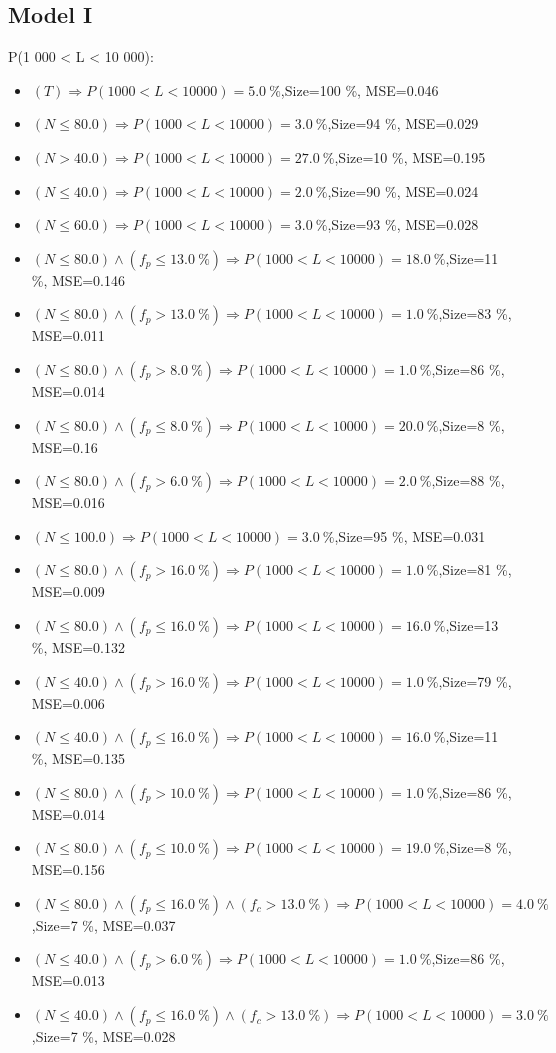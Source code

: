 \documentclass[numbered]{CSL}
\begin{document}
\subsection{Model I}
P(1 000 < L < 10 000):
\begin{itemize}
\item $(T) \Rightarrow P(1 000 < L < 10 000) = 5.0~\%$,\hfill Size=100 \%, MSE=0.046
\item $(N \leq 80.0) \Rightarrow P(1 000 < L < 10 000) = 3.0~\%$,\hfill Size=94 \%, MSE=0.029
\item $(N > 40.0) \Rightarrow P(1 000 < L < 10 000) = 27.0~\%$,\hfill Size=10 \%, MSE=0.195
\item $(N \leq 40.0) \Rightarrow P(1 000 < L < 10 000) = 2.0~\%$,\hfill Size=90 \%, MSE=0.024
\item $(N \leq 60.0) \Rightarrow P(1 000 < L < 10 000) = 3.0~\%$,\hfill Size=93 \%, MSE=0.028
\item $(N \leq 80.0) \land (f_p \leq 13.0~\%) \Rightarrow P(1 000 < L < 10 000) = 18.0~\%$,\hfill Size=11 \%, MSE=0.146
\item $(N \leq 80.0) \land (f_p > 13.0~\%) \Rightarrow P(1 000 < L < 10 000) = 1.0~\%$,\hfill Size=83 \%, MSE=0.011
\item $(N \leq 80.0) \land (f_p > 8.0~\%) \Rightarrow P(1 000 < L < 10 000) = 1.0~\%$,\hfill Size=86 \%, MSE=0.014
\item $(N \leq 80.0) \land (f_p \leq 8.0~\%) \Rightarrow P(1 000 < L < 10 000) = 20.0~\%$,\hfill Size=8 \%, MSE=0.16
\item $(N \leq 80.0) \land (f_p > 6.0~\%) \Rightarrow P(1 000 < L < 10 000) = 2.0~\%$,\hfill Size=88 \%, MSE=0.016
\item $(N \leq 100.0) \Rightarrow P(1 000 < L < 10 000) = 3.0~\%$,\hfill Size=95 \%, MSE=0.031
\item $(N \leq 80.0) \land (f_p > 16.0~\%) \Rightarrow P(1 000 < L < 10 000) = 1.0~\%$,\hfill Size=81 \%, MSE=0.009
\item $(N \leq 80.0) \land (f_p \leq 16.0~\%) \Rightarrow P(1 000 < L < 10 000) = 16.0~\%$,\hfill Size=13 \%, MSE=0.132
\item $(N \leq 40.0) \land (f_p > 16.0~\%) \Rightarrow P(1 000 < L < 10 000) = 1.0~\%$,\hfill Size=79 \%, MSE=0.006
\item $(N \leq 40.0) \land (f_p \leq 16.0~\%) \Rightarrow P(1 000 < L < 10 000) = 16.0~\%$,\hfill Size=11 \%, MSE=0.135
\item $(N \leq 80.0) \land (f_p > 10.0~\%) \Rightarrow P(1 000 < L < 10 000) = 1.0~\%$,\hfill Size=86 \%, MSE=0.014
\item $(N \leq 80.0) \land (f_p \leq 10.0~\%) \Rightarrow P(1 000 < L < 10 000) = 19.0~\%$,\hfill Size=8 \%, MSE=0.156
\item $(N \leq 80.0) \land (f_p \leq 16.0~\%) \land (f_c > 13.0~\%) \Rightarrow P(1 000 < L < 10 000) = 4.0~\%$,\hfill Size=7 \%, MSE=0.037
\item $(N \leq 40.0) \land (f_p > 6.0~\%) \Rightarrow P(1 000 < L < 10 000) = 1.0~\%$,\hfill Size=86 \%, MSE=0.013
\item $(N \leq 40.0) \land (f_p \leq 16.0~\%) \land (f_c > 13.0~\%) \Rightarrow P(1 000 < L < 10 000) = 3.0~\%$,\hfill Size=7 \%, MSE=0.028
\end{itemize}
\end{document}
